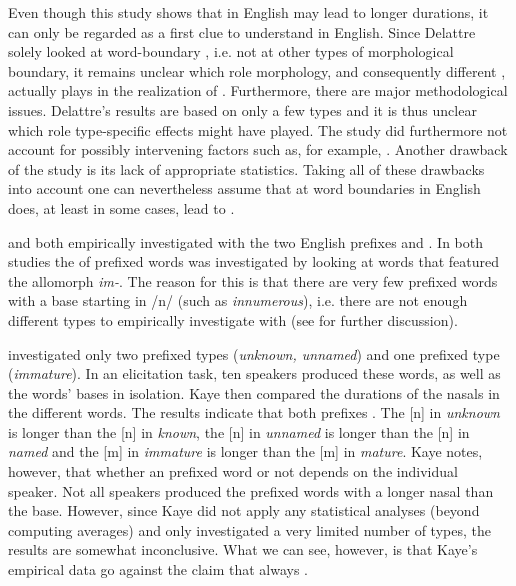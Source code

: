 Even though this study shows that  in English may lead to longer durations, it can only be regarded as a first clue to understand  in English. Since Delattre solely looked at word-boundary , i.e. not at other types of morphological boundary, it remains unclear which role morphology, and consequently different , actually plays in the realization of . Furthermore, there are major methodological issues. Delattre's results are based on only a few types and it is thus unclear which role type-specific effects might have played. The study did furthermore not account for possibly intervening factors such as, for example, . Another drawback of the study is its lack of appropriate statistics. Taking all of these drawbacks into account one can nevertheless assume that  at word boundaries in English does, at least in some cases, lead to .


\citet{Kaye.2005} and \citet{Oh.2012} both empirically investigated  with the two English prefixes  and . In both studies the  of prefixed words was investigated by looking at words that featured the allomorph \textit{im-}. The reason for this is that there are very few prefixed words with a base starting in /n/ (such as \textit{innumerous}), i.e. there are not enough different types to empirically investigate  with  (see  for further discussion). 


\cite{Kaye.2005} investigated  only two prefixed types (\textit{unknown, unnamed}) and one  prefixed type (\textit{immature}). In an elicitation task, ten speakers produced these words, as well as the words’ bases in isolation. Kaye then compared the durations of the nasals in the different words. The results indicate that both prefixes . The [n] in \textit{unknown} is longer than the [n] in \textit{known},  the [n] in \textit{unnamed} is longer than the [n] in \textit{named} and the [m] in \textit{immature} is longer than the [m] in \textit{mature}. Kaye notes, however, that whether an prefixed word  or not depends  on the individual speaker. Not all speakers produced the prefixed words with a longer nasal than the base. However, since Kaye did not apply any statistical analyses (beyond computing averages) and only investigated a very limited number of types, the results are somewhat inconclusive. What we can see, however, is that Kaye's empirical data go against the claim that  always .


